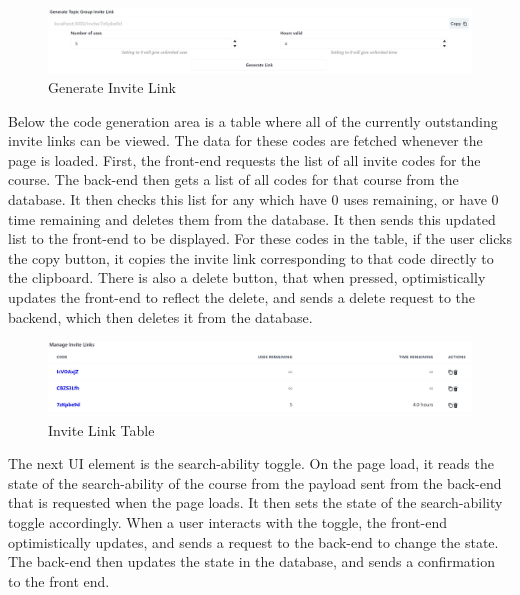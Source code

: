 \begin{figure}[h!]
    \centering
    \includegraphics[scale=0.1]{images/accounts-staff-link.jpg}
    \caption{Generate Invite Link}
\end{figure}

Below the code generation area is a table where all of the currently outstanding invite links can be viewed. The data for these codes are fetched whenever the page is loaded. First, the front-end requests the list of all invite codes for the course. The back-end then gets a list of all codes for that course from the database. It then checks this list for any which have 0 uses remaining, or have 0 time remaining and deletes them from the database. It then sends this updated list to the front-end to be displayed. For these codes in the table, if the user clicks the copy button, it copies the invite link corresponding to that code directly to the clipboard. There is also a delete button, that when pressed, optimistically updates the front-end to reflect the delete, and sends a delete request to the backend, which then deletes it from the database.

\begin{figure}[h!]
    \centering
    \includegraphics[scale=0.1]{images/accounts-staff-table.jpg}
    \caption{Invite Link Table}
\end{figure}

The next UI element is the search-ability toggle. On the page load, it reads the state of the search-ability of the course from the payload sent from the back-end that is requested when the page loads. It then sets the state of the search-ability toggle accordingly. When a user interacts with the toggle, the front-end optimistically updates, and sends a request to the back-end to change the state. The back-end then updates the state in the database, and sends a confirmation to the front end. 


